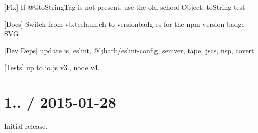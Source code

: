 
\begin{DoxyItemize}
\item \mbox{[}Fix\mbox{]} If {\ttfamily @@to\+String\+Tag} is not present, use the old-\/school {\ttfamily Object\+::to\+String} test
\item \mbox{[}Docs\mbox{]} Switch from vb.\+teelaun.\+ch to versionbadg.\+es for the npm version badge S\+VG
\item \mbox{[}Dev Deps\mbox{]} update {\ttfamily is}, {\ttfamily eslint}, {\ttfamily @ljharb/eslint-\/config}, {\ttfamily semver}, {\ttfamily tape}, {\ttfamily jscs}, {\ttfamily nsp}, {\ttfamily covert}
\item \mbox{[}Tests\mbox{]} up to {\ttfamily io.\+js} {\ttfamily v3.}, {\ttfamily node} {\ttfamily v4.}
\end{DoxyItemize}

\section*{1.. / 2015-\/01-\/28 }


\begin{DoxyItemize}
\item Initial release. 
\end{DoxyItemize}